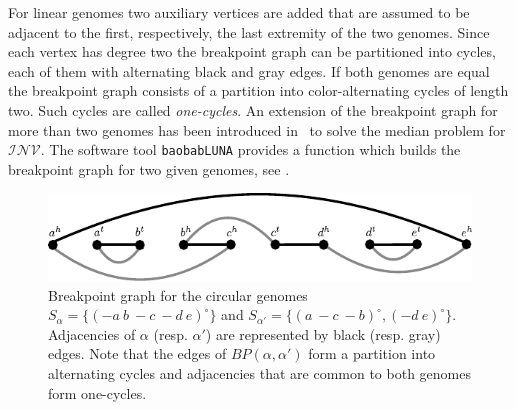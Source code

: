 \documentclass{svmult}
\newcommand{\m}[1]{\mathcal{#1}}
\begin{document}
%
For linear genomes two auxiliary vertices are added that are assumed to be
adjacent to the first, respectively, the last extremity of the two genomes.
Since each vertex has degree two the breakpoint graph can be 
partitioned into cycles, each of them with alternating black and gray edges. 
%
If both genomes are equal the breakpoint graph consists of a partition into color-alternating cycles of length two. 
Such cycles are called \emph{one-cycles}.
%
An extension of the breakpoint graph for more than two genomes has been
introduced in~\cite{Caprara_2003} to solve the median problem for $\m{INV}$.
%
The software tool \texttt{baobabLUNA} provides a function which builds the
breakpoint graph for two given genomes, see .

\begin{figure}
\centering
\includegraphics[width=.7\textwidth]{figures/breakpoint_graph_circular.pdf}
\caption{Breakpoint graph for the circular genomes
$S_{\alpha}=\{(-{a}~b~-{c}~-{d}~e)^\circ\}$ and
$S_{\alpha'}=\{(a~-{c}~-{b})^\circ,(-{d}~e)^\circ\}$. Adjacencies of
$\alpha$ (resp. $\alpha'$) are represented by black (resp. gray) edges. Note that the
edges of $BP(\alpha,\alpha')$ form a partition into alternating cycles and 
adjacencies that are common to both genomes form one-cycles.}
\label{fig:breakpoint_graph_circular}
\end{figure}
\end{document}
